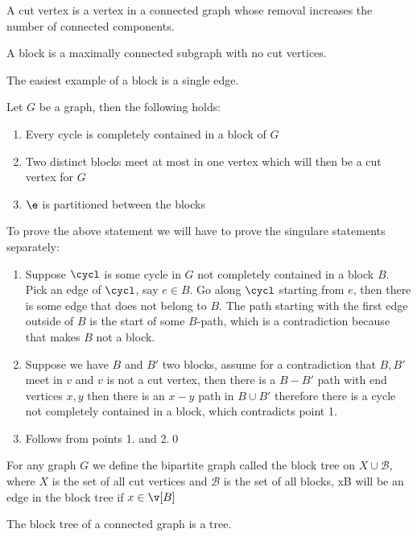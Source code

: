 \begin{definition}
    A cut vertex is a vertex in a connected graph whose removal increases the number of connected components.
\end{definition}
\begin{definition}[Block]
    A block is a maximally connected subgraph with no cut vertices.
\end{definition}
The easiest example of a block is a single edge.
\begin{customlemma}{3.2}
\label{lemma:3.2}
    Let $G$ be a graph, then the following holds:
    \begin{enumerate}
        \item Every cycle is completely contained in a block of $G$
        \item Two distinct blocks meet at most in one vertex which will then be a cut vertex for $G$
        \item $\e$ is partitioned between the blocks
    \end{enumerate}
\end{customlemma}
\begin{prf}
    To prove the above statement we will have to prove the singulare statements separately:
    \begin{enumerate}
        \item Suppose $\cycl$ is some cycle in $G$ not completely contained in a block $B$. Pick an edge of $\cycl$, say $e \in B$. Go along $\cycl$ starting from $e$, then there is some edge that does not belong to $B$. The path starting with the first edge outside of $B$ is the start of some $B$-path, which is a contradiction because that makes $B$ not a block.
        \item Suppose we have $B$ and $B'$ two blocks, assume for a contradiction that $B, B'$ meet in $v$ and $v$ is not a cut vertex, then there is a $B - B'$ path with end vertices $x, y$ then there is an $x - y$ path in $B \cup B'$ therefore there is a cycle not completely contained in a block, which contradicts point 1.
        \item Follows from points 1. and 2.\qed
    \end{enumerate}
\end{prf}
For any graph $G$ we define the bipartite graph called the block tree on $X \cup \mathcal{B}$, where $X$ is the set of all cut vertices and $\mathcal{B}$ is the set of all blocks, xB will be an edge in the block tree if $x \in \v[B]$
\begin{customproposition}{3.3}
\label{proposition:3.3}
    The block tree of a connected graph is a tree.
\end{customproposition}
